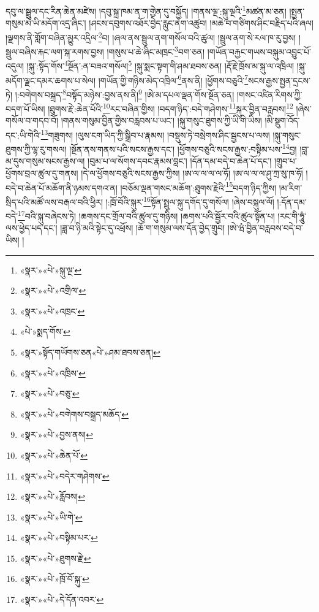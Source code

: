 དབུ་ལ་སྦྲུལ་དང་རིན་ཆེན་མཛེས། །དབུ་སྐྲ་ཁམ་ན་ག་གྱེན་དུ་བསྐྱོད། །གནས་ལྔ་:སྐུ་ལྔའི་\footnote{«སྣར་»«པེ་»སྐུ་ལྔ་}མཚན་མ་ཅན། །སྤྱན་གསུམ་མེ་ཡི་མདོག་འདྲ་ཞིང་། །ཤངས་དབུགས་འཐོར་བྱེད་རླུང་ནག་འཚུབ། །མཆེ་བ་གཙིགས་ཤིང་བརྗིད་པའི་ཞལ། །ལྗགས་ནི་གློག་བཞིན་མྱུར་འདྲིལ་\footnote{«སྣར་»«པེ་»འགྲིལ་}བ། །ཞལ་ནས་སྦྲུལ་ནག་གསོལ་བའི་ཚུལ། །སྦྲུལ་ནག་སེ་རལ་ཁ་རུ་བྱས། །སྦྲུལ་བཞིས་རྐང་ལག་སྐ་རགས་བྱས། །གསུས་པ་ཆེ་ཞིང་མཁྲང་\footnote{«སྣར་»«པེ་»འཁྲང་}བག་ཅན། །གཡོན་བརྐྱང་གཡས་བསྐུམ་འབྱུང་པོ་འདུལ། །སྐུ་:སྟོད་གོས་\footnote{«པེ་»སྨད་གོས་}སྔོན་:ན་བཟའ་གསོལ།\footnote{«སྣར་»སྟོད་གཡོགས་ཅན«པེ་»ཤམ་ཐབས་ཅན།} །སྐུ་སྨང་སྟག་གི་ཤམ་ཐབས་ཅན། །རྡོ་རྗེ་ཁྲོས་མ་སྐུ་ལ་འཁྲིལ། །སྐུ་མདོག་ལྗང་དམར་ཆགས་པ་སེལ། །གཡོན་གྱི་གཉིས་མེད་འཁྲིལ་\footnote{«སྣར་»«པེ་»འཁྲིས་}ནས་ནི། །ཕྱོགས་བཅུའི་\footnote{«སྣར་»«པེ་»བཅུ་}སངས་རྒྱས་སྤྱན་དྲངས་ཏེ། །:བགེགས་བསྐྲད་\footnote{«སྣར་»«པེ་»བགེགས་བསྐྲད་མཆོད་}བསྟོད་མཉེས་:བྱས་ནས་ནི།\footnote{«སྣར་»«པེ་»བྱས་ནས།} །ཨེ་མ་དཔལ་ལྡན་གོས་སྔོན་ཅན། །གསང་འཛིན་རིགས་ཀྱི་བདག་པོ་ཡིས། །ཐུགས་རྗེ་:ཆེན་པོའི་\footnote{«སྣར་»«པེ་»ཆེན་པོ་}རང་བཞིན་གྱིས། །བདག་ཉིད་:བདེ་གཤེགས་\footnote{«སྣར་»«པེ་»བདེར་གཤེགས་}སྐུར་བྱིན་བརླབས།\footnote{«སྣར་»«པེ་»རློབས།} །ཞེས་གསོལ་བ་གདབ་བོ། །གནས་གསུམ་བྱིན་གྱིས་བརླབས་པ་ཡང་། །སྐུ་གསུང་ཐུགས་ཀྱི་ཡི་གེ་ཡིས། །མི་སྡུག་འོད་དང་:ཡི་གེའི་\footnote{«སྣར་»«པེ་»ཡི་གེ་}གཟུགས། །ལུས་ངག་ཡིད་ཀྱི་སྒྲིབ་པ་རྣམས། །བསྡུས་ཏེ་བསྲེགས་ཤིང་སྦྱངས་པ་ལས། །སྐུ་གསུང་ཐུགས་ཀྱི་ལྷ་རུ་གསལ། །སྔོན་ནས་གནས་པའི་སངས་རྒྱས་དང་། །ཕྱོགས་བཅུའི་སངས་རྒྱས་:བསྟིམ་པས་\footnote{«སྣར་»«པེ་»བསྟིམ་པར་}བྱ། །བླ་མ་དུས་གསུམ་སངས་རྒྱས་ལ། །བུམ་པ་ལ་སོགས་དབང་རྣམས་བླང་། །དོན་དམ་བདེ་བ་ཆེན་པོ་དང་། །གྲུབ་པ་ཕྱོགས་བྲལ་ཚུལ་དུ་གནས། །དེ་ལ་ཕྱོགས་བཅུའི་སངས་རྒྱས་ཀྱིས། །ཨ་ལ་ལ་ལ་ལ་ཧོ། །ཨ་ལ་ལ་ལ་ཤུ་ཀྲ་སུ་ཁ་ཧོ། །བདེ་བ་ཆེན་པོ་མཆོག་ནི་ཉམས་དགའ་ན། །བཅོམ་ལྡན་གསང་མཆོག་:ཐུགས་རྗེའི་\footnote{«སྣར་»«པེ་»ཐུགས་རྗེ་}བདག་ཉིད་ཀྱིས། །མ་རིག་སྲིད་པའི་མཚོ་ལས་བརྒལ་བའི་ཕྱིར། །:ཁྲོ་བོའི་སྐུར་\footnote{«སྣར་»«པེ་»ཁྲོ་བོ་སྐུ་}སྟོན་སྤྲུལ་སྐུ་དགོད་དུ་གསོལ། །ཞེས་བསྐུལ་ལོ། །:དོན་དམ་བདེ་\footnote{«སྣར་»«པེ་»དེ་དོན་འབར་}བའི་སྐུ་བཞེངས་ཏེ། །ཆགས་དང་གྲོལ་བའི་ཚུལ་དུ་གཉིས། །ཆགས་པའི་སྦྱོར་བའི་ཚུལ་སྟོན་པ། །རང་གི་ཧཱུཾ་ལས་ཕྱེད་པད་དང་། །ཟླ་བ་ཉི་མའི་སྟེང་དུ་འཕྲོས། །ཆོ་ག་གསུམ་ལས་དོན་བྱེད་གྲུབ། །ཨེ་ཝཾ་བྱིན་བརླབས་བདེ་བ་ཡིས། །
